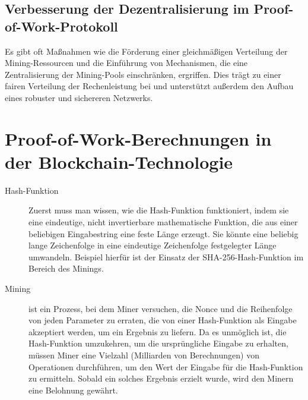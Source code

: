 \subsection{Verbesserung der Dezentralisierung im Proof-of-Work-Protokoll}
Es gibt oft Maßnahmen wie die Förderung einer gleichmäßigen Verteilung der Mining-Ressourcen und die Einführung von Mechanismen, die eine Zentralisierung der Mining-Pools einschränken, ergriffen. Dies trägt zu einer fairen Verteilung der Rechenleistung bei und unterstützt außerdem den Aufbau eines robuster und sichereren Netzwerks.

\section{Proof-of-Work-Berechnungen in der Blockchain-Technologie}

\begin{description}
	\item[Hash-Funktion] Zuerst muss man wissen, wie die Hash-Funktion funktioniert, indem sie eine eindeutige, nicht invertierbare mathematische Funktion, die aus einer beliebigen Eingabestring eine feste Länge erzeugt. Sie könnte eine beliebig lange Zeichenfolge in eine eindeutige Zeichenfolge festgelegter Länge umwandeln. Beispiel hierfür ist der Einsatz der SHA-256-Hash-Funktion im Bereich des Minings.
	\item[Mining] ist ein Prozess, bei dem Miner versuchen, die Nonce und die Reihenfolge von jeden Parameter zu erraten, die von einer Hash-Funktion als Eingabe akzeptiert werden, um ein Ergebnis zu liefern. Da es unmöglich ist, die Hash-Funktion umzukehren, um die ursprüngliche Eingabe zu erhalten, müssen Miner eine Vielzahl (Milliarden von Berechnungen) von Operationen durchführen, um den Wert der Eingabe für die Hash-Funktion zu ermitteln. Sobald ein solches Ergebnis erzielt wurde, wird den Minern eine Belohnung gewährt.
\end{description}
\newpage
